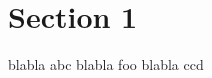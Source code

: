 \documentclass{article}
\begin{document}
\printglossaries
\section{Section 1}
blabla \gls{abc} blabla \gls{foo} blabla \gls{ccd}
\end{document}
